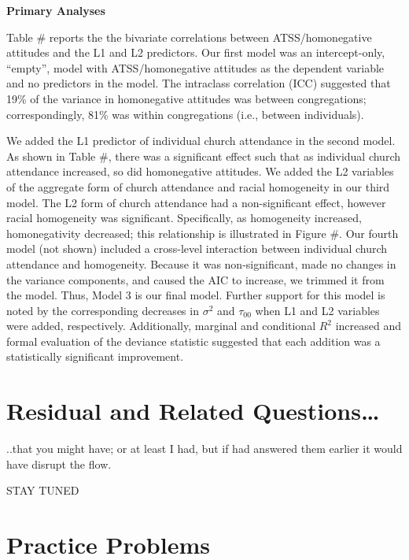\documentclass[
  11pt,
]{book}
\begin{document}
\textbf{Primary Analyses}

Table \# reports the the bivariate correlations between ATSS/homonegative attitudes and the L1 and L2 predictors. Our first model was an intercept-only, ``empty'', model with ATSS/homonegative attitudes as the dependent variable and no predictors in the model. The intraclass correlation (ICC) suggested that 19\% of the variance in homonegative attitudes was between congregations; correspondingly, 81\% was within congregations (i.e., between individuals).

We added the L1 predictor of individual church attendance in the second model. As shown in Table \#, there was a significant effect such that as individual church attendance increased, so did homonegative attitudes. We added the L2 variables of the aggregate form of church attendance and racial homogeneity in our third model. The L2 form of church attendance had a non-significant effect, however racial homogeneity was significant. Specifically, as homogeneity increased, homonegativity decreased; this relationship is illustrated in Figure \#. Our fourth model (not shown) included a cross-level interaction between individual church attendance and homogeneity. Because it was non-significant, made no changes in the variance components, and caused the AIC to increase, we trimmed it from the model. Thus, Model 3 is our final model. Further support for this model is noted by the corresponding decreases in \(\sigma^{2}\) and \(\tau _{00}\) when L1 and L2 variables were added, respectively. Additionally, marginal and conditional \(R^2\) increased and formal evaluation of the deviance statistic suggested that each addition was a statistically significant improvement.

\hypertarget{residual-and-related-questions}{%
\section{Residual and Related Questions\ldots{}}\label{residual-and-related-questions}}

..that you might have; or at least I had, but if had answered them earlier it would have disrupt the flow.

STAY TUNED

\hypertarget{practice-problems}{%
\section{Practice Problems}\label{practice-problems}}
\end{document}

